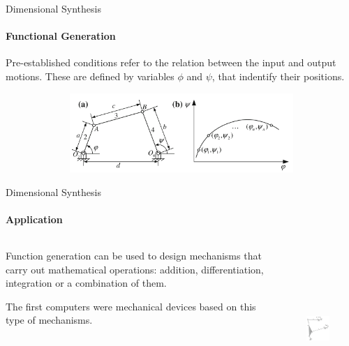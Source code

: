 \documentclass[aspectratio=169]{beamer}
\begin{document}
\begin{frame}[t]{Dimensional Synthesis}
\framesubtitle{Functional Generation}
Pre-established conditions refer to the relation between the input and output motions. These are defined by variables $\phi$ and $\psi$, that indentify their positions.
    \begin{figure}[H]
        \centering\includegraphics[height=3cm,width=1\textwidth,keepaspectratio]{func_gen1.png}
        \label{fig:func_gen1.png}
    \end{figure}
\end{frame}

\begin{frame}[t]{Dimensional Synthesis}
\framesubtitle{Application}
    \begin{columns}[T,onlytextwidth]
        \begin{column}{0.49\textwidth}
            Function generation can be used to design mechanisms that carry out mathematical operations: addition, differentiation, integration or a combination of them. \smallskip

            The first computers were mechanical devices based on this type of mechanisms.
        \end{column}
        \begin{column}{0.49\textwidth}
            \vspace{-1cm}
            \begin{figure}[H]
                \centering\includegraphics[height=6cm,width=1\textwidth,keepaspectratio]{func_gen2.png}
                \label{fig:func_gen2.png}
            \end{figure}
        \end{column}
    \end{columns}
\end{frame}
\end{document}
